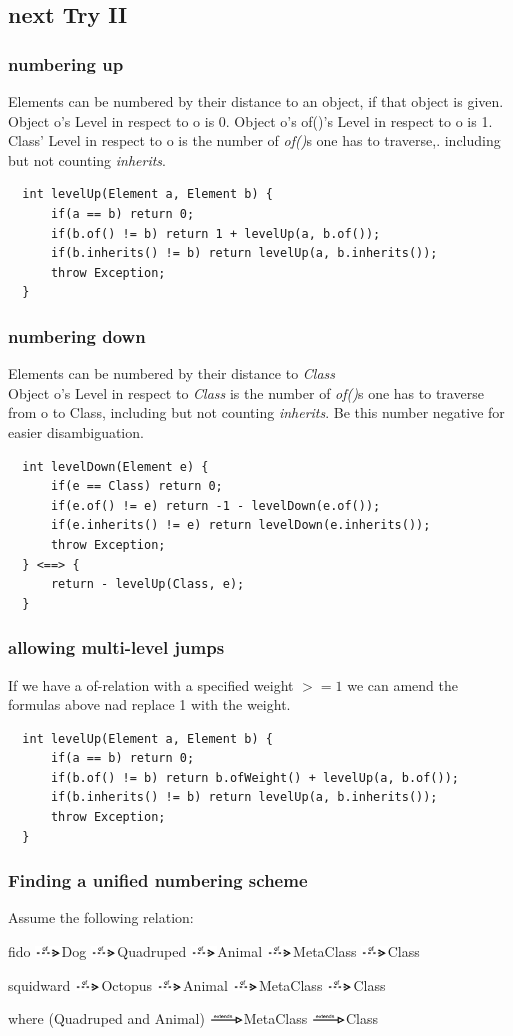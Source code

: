 \documentclass{scrreprt}
\newcounter{myCounter}[subsubsection]
\newcommand{\of}{%
\includegraphics[height=8pt]{img/arrowOf.png}\hspace{1mm}}
\newcommand{\extends}{%
\includegraphics[height=8pt]{img/arrowExtends.png}\hspace{1mm}}
\newcommand{\layerThree}[1]{\subsection{#1} \setcounter{myCounter}{0}}
\newcommand{\layerFour}[1]{\subsubsection{#1}}
\begin{document}
\layerThree{next Try II} 

\newpage

\layerFour{numbering up} 
Elements can be numbered by their distance to an object, if that object is given. \\
Object o's Level in respect to o is 0.
Object o's of()'s Level in respect to o is 1.
Class' Level in respect to o is the number of \textit{of()}s one has to traverse,. including but not counting \textit{inherits}.
\begin{verbatim}
  int levelUp(Element a, Element b) {
      if(a == b) return 0;
      if(b.of() != b) return 1 + levelUp(a, b.of());
      if(b.inherits() != b) return levelUp(a, b.inherits());
      throw Exception;
  }
\end{verbatim}

\layerFour{numbering down} 
Elements can be numbered by their distance to \textit{Class} \\
Object o's Level in respect to \textit{Class} is the number of \textit{of()}s one has to traverse from o to Class, including but not counting \textit{inherits}. Be this number negative for easier disambiguation.
\begin{verbatim}
  int levelDown(Element e) {
      if(e == Class) return 0;
      if(e.of() != e) return -1 - levelDown(e.of());
      if(e.inherits() != e) return levelDown(e.inherits());
      throw Exception;
  } <==> {
      return - levelUp(Class, e);
  }	
\end{verbatim}

\layerFour{allowing multi-level jumps}
If we have a of-relation with a specified weight $>=1$ we can amend the formulas above nad replace 1 with the weight.
\begin{verbatim}
  int levelUp(Element a, Element b) {
      if(a == b) return 0;
      if(b.of() != b) return b.ofWeight() + levelUp(a, b.of());
      if(b.inherits() != b) return levelUp(a, b.inherits());
      throw Exception;
  }
\end{verbatim}

\newpage

\layerFour{Finding a unified numbering scheme} 

Assume the following relation:

fido \of Dog \of Quadruped \of Animal \of MetaClass \of Class

squidward \of Octopus \of Animal \of MetaClass \of Class

where (Quadruped and Animal) \extends MetaClass \extends Class
\end{document}
